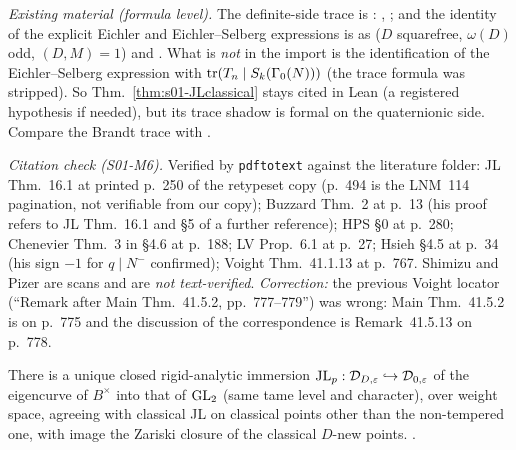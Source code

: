 \noindent\emph{Existing material (formula level).} The definite-side trace is \stformal:
 ,  ; and the
identity of the explicit Eichler and Eichler--Selberg expressions is \stformal{} as 
 ($D$ squarefree, $\omega(D)$ odd, $(D,M)=1$) and . What is
\emph{not} in the import is the identification of the Eichler--Selberg expression with $\operatorname{tr}(T_n\mid S_k(\Gamma_0(N)))$ (the
trace formula was stripped). So Thm.~\ref{thm:s01-JLclassical} stays cited in Lean (a registered hypothesis if needed),
but its trace shadow is formal on the quaternionic side. Compare the Brandt trace with
.

\noindent\emph{Citation check (S01-M6).} Verified by \texttt{pdftotext} against the literature folder: JL Thm.~16.1 at printed p.~250 of the retypeset copy (p.~494 is the LNM~114 pagination, not verifiable from our copy);
Buzzard Thm.~2 at p.~13 (his proof refers to JL Thm.~16.1 and \S5 of a further reference); HPS \S0 at p.~280; Chenevier Thm.~3 in \S4.6 at p.~188; LV Prop.~6.1 at p.~27;
Hsieh \S4.5 at p.~34 (his sign $-1$ for $q\mid N^-$ confirmed); Voight Thm.~41.1.13 at p.~767. Shimizu and Pizer are scans and are \emph{not text-verified}.
\emph{Correction:} the previous Voight locator (``Remark after Main Thm.~41.5.2, pp.~777--779'') was wrong: Main Thm.~41.5.2 is on p.~775 and the discussion
of the correspondence is Remark~41.5.13 on p.~778.

\begin{theorem}\label{thm:s01-chenevier}
There is a unique closed rigid-analytic immersion $\mathrm{JL}_p:\mathcal D_{D,\varepsilon}\hookrightarrow\mathcal D_{0,\varepsilon}$ of the
eigencurve of $B^\times$ into that of $\mathrm{GL}_2$ (same tame level and character), over weight space, agreeing with classical JL on
classical points other than the non-tempered one, with image the Zariski closure of the classical $D$-new points.
\stcited{} .
\end{theorem}

